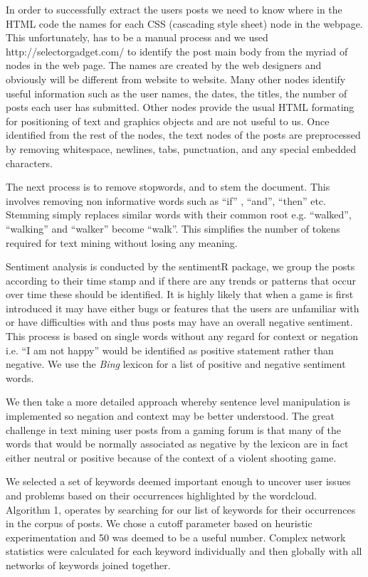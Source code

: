 \documentclass{ewic}
\begin{document}
In order to successfully extract the users posts we need to know where in the HTML code the names for each CSS (cascading style sheet) node in the webpage. This unfortunately, has to be a manual process and we used  http://selectorgadget.com/ to identify the post main body from the myriad of nodes in the web page. The names are created by the web designers and obviously will be different from website to website. Many other nodes identify useful information such as the user names, the dates, the titles, the number of posts each user has submitted. Other nodes provide the usual HTML formating for positioning of text and graphics objects and are not useful to us. Once identified from the rest of the nodes, the text nodes  of the posts are preprocessed by removing whitespace, newlines, tabs, punctuation, and any special embedded characters.

The next process is to remove stopwords, and to stem the document. This involves removing non informative words such as ``if'' , ``and'', ``then'' etc. Stemming simply replaces similar words with their common root e.g. ``walked'', ``walking'' and ``walker'' become ``walk''. This simplifies the number of tokens required for text mining without losing any meaning. 

Sentiment analysis is conducted by the sentimentR package, we group the posts according to their time stamp and if there are any trends or patterns that occur over time these should be identified. It is highly likely that when a game is first introduced it may have either bugs or features that the users are unfamiliar with or have difficulties with and thus posts may have an overall negative sentiment. This process is based on single words without any regard for context or negation i.e. ``I am not happy'' would be identified as positive statement rather than negative. We use the {\it Bing} lexicon for a list of positive and negative sentiment words.

We then take a more detailed approach whereby sentence level manipulation is implemented so negation and context may be better understood. The great challenge in text mining user posts from a gaming forum is that many of the words that would be normally associated as negative by the lexicon are in fact either neutral or positive because of the context of a violent shooting game.

We selected a set of keywords deemed important enough to uncover user issues and problems based on their occurrences highlighted by the wordcloud. Algorithm 1, operates by  searching for our list of keywords for their occurrences in the corpus of posts. We chose a cutoff parameter based on heuristic experimentation and 50 was deemed to be a useful number. Complex network statistics were calculated for each keyword individually and then globally with all networks of keywords joined together.
\end{document}
